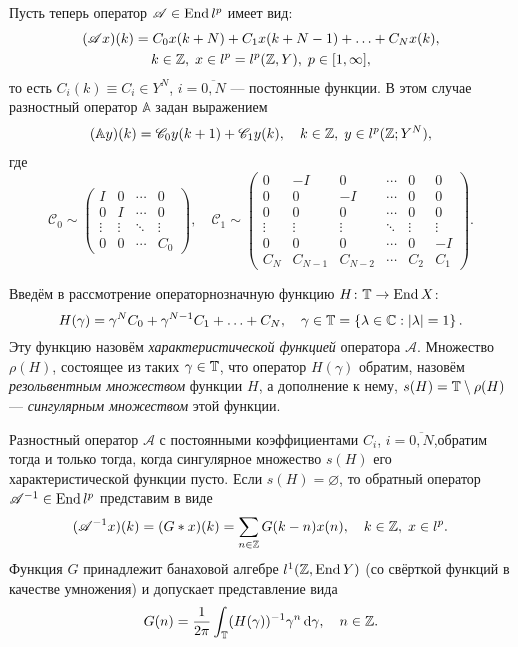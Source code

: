 Пусть теперь оператор $\mathcal A \in \operatorname{End}{l^p}$ имеет вид:
\begin{gather*}
    (\mathcal A x)(k) = C_0 x(k + N) + C_1 x(k + N - 1) + \dotsc + C_N x(k), \\
    k \in \mathbb{Z}, \; x \in l^p = l^p(\mathbb{Z}, Y), \; p \in [1, \infty],
\end{gather*}
то есть $C_i(k) \equiv C_i \in Y^N$, $i = \overline{0,N}$ --- постоянные функции. В этом случае разностный оператор $\mathbb A$ задан выражением
\begin{align*}
    (\mathbb A y)(k) = \mathcal C_0 y(k + 1) + \mathcal C_1 y(k), \quad k \in \mathbb{Z}, \; y \in l^p(\mathbb{Z}; Y^N),
\end{align*}
где
\[
    \mathcal C_0 \sim \begin{pmatrix}
    I & 0 & \cdots &  0 \\
    0 & I  & \cdots &  0 \\
    \vdots & \vdots & \ddots &  \vdots \\
    0 & 0 & \cdots &  C_0
   \end{pmatrix},\quad
   \mathcal C_1 \sim \begin{pmatrix}
    0 & -I & 0  & \cdots & 0 & 0 \\
    0 & 0  & -I & \cdots & 0 & 0 \\
    0 & 0  & 0 & \cdots & 0 & 0 \\
    \vdots & \vdots & \vdots & \ddots & \vdots & \vdots \\
    0 & 0 & 0 & \cdots & 0 & -I \\
    C_N & C_{N-1} & C_{N-2} & \cdots & C_2 & C_1
   \end{pmatrix}.
\]

Введём в рассмотрение операторнозначную функцию $H \colon \mathbb{T} \to \operatorname{End} X$:
\[ H(\gamma) = \gamma^N C_0 + \gamma^{N-1} C_1 + \dotsc + C_N, \quad \gamma \in \mathbb{T} = \left\{\lambda \in \mathbb{C} : \left|\lambda\right| = 1\right\}. \]
Эту функцию назовём \emph{характеристической функцией} оператора $ \mathcal A$. Множество $\rho(H)$, состоящее из таких $\gamma \in \mathbb{T}$, что оператор $H(\gamma)$ обратим, назовём \emph{резольвентным множеством} функции $H$, а дополнение к нему, $s(H) = \mathbb{T} \setminus \rho(H)$ --- \emph{сингулярным множеством} этой функции.

\begin{theorem}\label{th:constant_inverse}
    Разностный оператор $\mathcal A$ с постоянными коэффициентами $C_i$, $i = \overline{0,N}$,обратим тогда и только тогда, когда сингулярное множество $s(H)$ его характеристической функции пусто. Если $s(H) = \varnothing$, то обратный оператор $\mathcal A^{-1} \in \operatorname{End} l^p$ представим в виде
    \begin{equation}\label{eq:invconst}
     (\mathcal A^{-1} x)(k) = (G * x)(k)= \sum_{n \in \mathbb{Z}} G(k - n) x(n), \quad k \in \mathbb{Z}, \; x \in l^p.
    \end{equation}
    Функция $G$ принадлежит банаховой алгебре $l^1(\mathbb{Z}, \operatorname{End} Y)$ (со свёрткой функций в качестве умножения) и допускает представление вида
    \[ G(n) = \frac{1}{2 \pi} \int_{\mathbb{T}} (H(\gamma))^{-1} \gamma^n \,\mathrm{d} \gamma, \quad n \in \mathbb{Z}. \]
\end{theorem}

